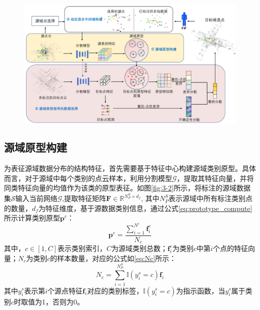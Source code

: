 \vspace{-0.1cm}
\begin{figure}[h]
    \centering
    \includegraphics[width = \textwidth]{ljx/figure/3-1.pdf}
    \label{fig:framework-3}
\end{figure}
\vspace{-0.35cm}

\subsection{源域原型构建}
为表征源域数据分布的结构特征，首先需要基于特征中心构建源域类别原型。具体而言，对于源域中每个类别的点云样本，利用分割模型$\mathcal{G}$，提取其特征向量，并将同类特征向量的均值作为该类的原型表征。如图\ref{fig:3-2}所示，将标注的源域数据集$\mathcal{S}$输入当前网络$\mathcal{G}$,提取特征矩阵$\mathbf{F} \in \mathbb{R}^{{N^S_P} \times d_f}$, 其中\(N^S_P\)表示源域中所有标注类别点的数量，$d_f$为特征维度，基于源数据类别信息，通过公式\eqref{eq:prototype_compute}所示计算类别原型\( \mathbf{p}^c \)：
\begin{equation}
    \label{eq:prototype_compute}
    \mathbf{p}^c = \frac{\sum_{i=1}^{N^c} \mathbf{f}_i^c}{N_c}
\end{equation}
其中，\( c \in [1, C] \)表示类别索引，\( C \)为源域类别总数；\( \mathbf{f}_i^c \)为类别\( c \)中第\( i \)个点的特征向量；\( N_c \)为类别\( c \)的样本数量，对应的公式如\eqref{eq:Nc}所示：
\begin{equation}
    \label{eq:Nc}
    N_c = \sum^{N^S_P}_{i=1} \mathbb{I}(y^s_i = c)\mathbf{f}_i
\end{equation}
其中\( y^s_i \)表示第\(i\)个源点特征\( \mathbf{f}_i \)对应的类别标签，$\mathbb{I}(y^s_i = c)$为指示函数，当$y^s_i$属于类别$c$时取值为1，否则为0。

